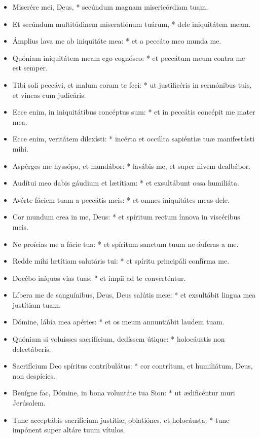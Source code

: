 \begin{itemize}[%
label=\null, %
leftmargin=0pt, %
itemindent=3mm, %
labelsep=0pt, %
labelwidth=0pt, %
rightmargin=0pt, %
parsep=0pt, %
topsep=0pt, %
itemsep=0pt]%


\item Miserére mei, Deus, * secúndum magnam misericórdiam tuam.
\item Et secúndum multitúdinem miseratiónum tuárum, * dele iniquitátem meam.
\item Ámplius lava me ab iniquitáte mea: * et a peccáto meo munda me.
\item Quóniam iniquitátem meam ego cognósco: * et peccátum meum contra me est semper.
\item Tibi soli peccávi, et malum coram te feci: * ut justificéris in sermónibus tuis, et vincas cum judicáris.
\item Ecce enim, in iniquitátibus concéptus sum: * et in peccátis concépit me mater mea.
\item Ecce enim, veritátem dilexísti: * incérta et occúlta sapiéntiæ tuæ manifestásti mihi.
\item Aspérges me hyssópo, et mundábor: * lavábis me, et super nivem dealbábor.
\item Audítui meo dabis gáudium et lætítiam: * et exsultábunt ossa humiliáta.
\item Avérte fáciem tuam a peccátis meis: * et omnes iniquitátes meas dele.
\item Cor mundum crea in me, Deus: * et spíritum rectum ínnova in viscéribus meis.
\item Ne proícias me a fácie tua: * et spíritum san\-ctum tuum ne áuferas a me.
\item Redde mihi lætítiam salutáris tui: * et spíritu principáli confírma me.
\item Docébo iníquos vias tuas: * et ímpii ad te converténtur.
\item Líbera me de sanguínibus, Deus, Deus salútis meæ: * et exsultábit lingua mea justítiam tuam.
\item Dómine, lábia mea apéries: * et os meum annuntiábit laudem tuam.
\item Quóniam si voluísses sacrifícium, dedíssem útique: * holocáustis non delectáberis.
\item Sacrifícium Deo spíritus contribulátus: * cor contrítum, et humiliátum, Deus, non despícies.
\item Benígne fac, Dómine, in bona voluntáte tua Sion: * ut ædificéntur muri Jerúsalem.
\item Tunc acceptábis sacrifícium justítiæ, oblatiónes, et holocáusta: * tunc impónent super altáre tuum vítulos.

\end{itemize}